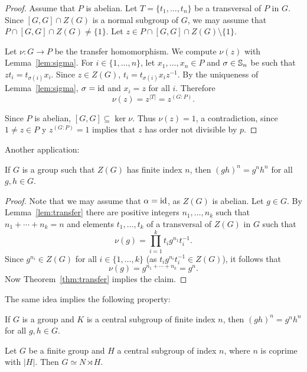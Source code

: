 \begin{proof}
	Assume that $P$ is abelian. Let $T=\{t_1,\dots,t_n\}$ be a transversal of $P$ in $G$. Since 
	$[G,G]\cap Z(G)$ is a normal subgroup of $G$, we may assume that 
	$P\cap [G,G]\cap Z(G)\ne\{1\}$. Let $z\in P\cap [G,G]\cap Z(G)\setminus\{1\}$. 
 
    Let $\nu\colon G\to P$ be the transfer homomorphism. We compute  
    $\nu(z)$ with Lemma~\ref{lem:sigma}. For $i\in\{1,\dots,n\}$, let 
    $x_1,\dots,x_n\in P$ and $\sigma\in\mathbb{S}_n$ be such that 
	$zt_i=t_{\sigma(i)}x_i$. Since $z\in Z(G)$, 
	$t_i=t_{\sigma(i)}x_iz^{-1}$. By the uniqueness of Lemma~\ref{lem:sigma}, 
	$\sigma=\operatorname{id}$ and $x_i=z$ for all $i$. Therefore  
	\[
	\nu(z)=z^{|T|}=z^{(G:P)}. 
	\]

	Since $P$ is abelian, $[G,G]\subseteq\ker\nu$. Thus $\nu(z)=1$, a contradiction, since 
    $1\ne z\in P$ y $z^{(G:P)}=1$ implies that $z$ has order not divisible by $p$. 
\end{proof}




Another application:

\begin{proposition}
	\label{pro:center}
	If $G$ is a group such that $Z(G)$ has finite index $n$, then
	$(gh)^n=g^nh^n$ for all $g,h\in G$.	
\end{proposition}

\begin{proof}
	Note that we may assume that $\alpha=\operatorname{id}$, as $Z(G)$ is
	abelian. Let $g\in G$. By Lemma~\ref{lem:transfer} there are positive integers 
    $n_1,\dots,n_k$ such that $n_1+\cdots+n_k=n$ and elements 
	$t_1,\dots,t_k$ of a transversal of $Z(G)$ in $G$ such that 
	\[
		\nu(g)=\prod_{i=1}^k t_ig^{n_1}t_i^{-1}.
	\]
	Since $g^{n_i}\in Z(G)$ for all $i\in\{1,\dots,k\}$ (as $t_ig^{n_i}t_i^{-1}\in Z(G)$), 
	it follows that 
	\[
	\nu(g)=g^{n_1+\cdots+n_k}=g^n.
	\]
	Now Theorem~\ref{thm:transfer} implies the claim.
\end{proof}

The same idea implies the following property:

\begin{exercise}
\label{xca:K_central}
	If $G$ is a group and $K$ is a central subgroup of finite index $n$, then
	$(gh)^n=g^nh^n$ for all $g,h\in G$.	
\end{exercise}

\begin{proposition}
	\label{prop:semidirecto}
	Let $G$ be a finite group and $H$ a central subgroup of index $n$, where 
	$n$ is coprime with $|H|$. Then
	$G\simeq N\rtimes H$.
\end{proposition}


